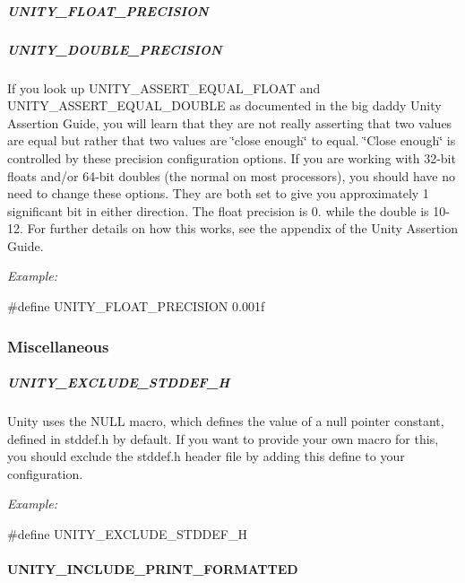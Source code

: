 \subparagraph*{{\ttfamily U\+N\+I\+T\+Y\+\_\+\+F\+L\+O\+A\+T\+\_\+\+P\+R\+E\+C\+I\+S\+I\+ON}}

\subparagraph*{{\ttfamily U\+N\+I\+T\+Y\+\_\+\+D\+O\+U\+B\+L\+E\+\_\+\+P\+R\+E\+C\+I\+S\+I\+ON}}

If you look up {\ttfamily U\+N\+I\+T\+Y\+\_\+\+A\+S\+S\+E\+R\+T\+\_\+\+E\+Q\+U\+A\+L\+\_\+\+F\+L\+O\+AT} and {\ttfamily U\+N\+I\+T\+Y\+\_\+\+A\+S\+S\+E\+R\+T\+\_\+\+E\+Q\+U\+A\+L\+\_\+\+D\+O\+U\+B\+LE} as documented in the big daddy Unity Assertion Guide, you will learn that they are not really asserting that two values are equal but rather that two values are \char`\"{}close enough\char`\"{} to equal. \char`\"{}\+Close enough\char`\"{} is controlled by these precision configuration options. If you are working with 32-\/bit floats and/or 64-\/bit doubles (the normal on most processors), you should have no need to change these options. They are both set to give you approximately 1 significant bit in either direction. The float precision is 0. while the double is 10-\/12. For further details on how this works, see the appendix of the Unity Assertion Guide.

{\itshape Example\+:} 
\begin{DoxyCode}
\textcolor{preprocessor}{#define UNITY\_FLOAT\_PRECISION 0.001f}
\end{DoxyCode}


\subsubsection*{Miscellaneous}

\subparagraph*{{\ttfamily U\+N\+I\+T\+Y\+\_\+\+E\+X\+C\+L\+U\+D\+E\+\_\+\+S\+T\+D\+D\+E\+F\+\_\+H}}

Unity uses the {\ttfamily N\+U\+LL} macro, which defines the value of a null pointer constant, defined in {\ttfamily stddef.\+h} by default. If you want to provide your own macro for this, you should exclude the {\ttfamily stddef.\+h} header file by adding this define to your configuration.

{\itshape Example\+:} 
\begin{DoxyCode}
\textcolor{preprocessor}{#define UNITY\_EXCLUDE\_STDDEF\_H}
\end{DoxyCode}


\paragraph*{{\ttfamily U\+N\+I\+T\+Y\+\_\+\+I\+N\+C\+L\+U\+D\+E\+\_\+\+P\+R\+I\+N\+T\+\_\+\+F\+O\+R\+M\+A\+T\+T\+ED}}

